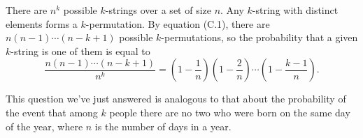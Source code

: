 \starred
There are $n^k$ possible $k$-strings over a set of size $n$.
Any $k$-string with distinct elements forms a $k$-permutation.
By equation (C.1), there are $n(n-1)\cdots(n-k+1)$ possible $k$-permutations, so the probability that a given $k$-string is one of them is equal to
\[
    \frac{n(n-1)\cdots(n-k+1)}{n^k} = \left(1-\frac{1}{n}\right)\left(1-\frac{2}{n}\right)\cdots\left(1-\frac{k-1}{n}\right).
\]

This question we've just answered is analogous to that about the probability of the event that among $k$ people there are no two who were born on the same day of the year, where $n$ is the number of days in a year.
